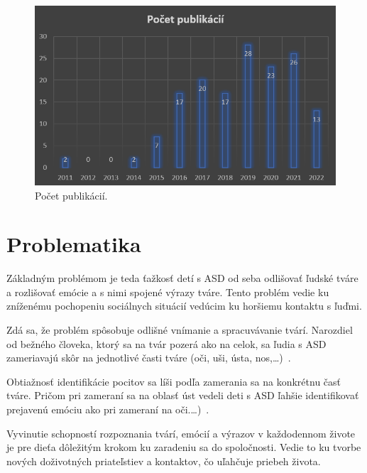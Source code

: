 \documentclass[10pt,twoside,slovak,a4paper]{article}
\begin{document}
\begin{figure}[tbh]
\centering
\includegraphics[scale=1]{graf.png}
\caption{Počet publikácií.}
\label{f:rozhod}
\end{figure}



\section{Problematika} \label{problematika}
Základným problémom je teda ťažkosť detí s ASD od seba odlišovať ľudské tváre a rozlišovať emócie a s nimi spojené výrazy tváre. Tento problém vedie ku zníženému pochopeniu sociálnych situácií vedúcim ku horšiemu kontaktu s ľuďmi.   

Zdá sa, že problém spôsobuje odlišné vnímanie a spracuvávanie tvárí. Narozdiel od bežného človeka, ktorý sa na tvár pozerá ako na celok, sa ľudia s ASD zameriavajú skôr na jednotlivé časti tváre (oči, uši, ústa, nos,\ldots{})~\cite{Avatar-Assistant}.

Obtiažnosť identifikácie pocitov sa líši podľa zamerania sa na konkrétnu časť tváre. Pričom pri zameraní sa na oblasť úst vedeli deti s ASD ľahšie identifikovať prejavenú emóciu ako pri zameraní na oči.\ldots{})~\cite{Avatar-Assistant}. 

Vyvinutie schopností rozpoznania tvárí, emócií a výrazov v každodennom živote je pre dieťa dôležitým krokom ku zaradeniu sa do spoločnosti. Vedie to ku tvorbe nových doživotných priateľstiev a kontaktov, čo uľahčuje priebeh života. 
\end{document}
